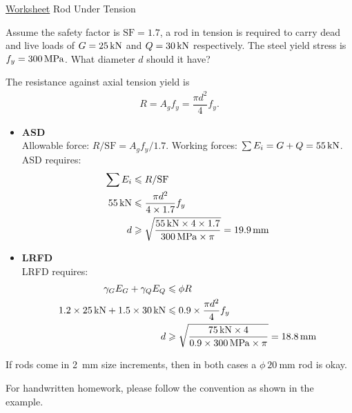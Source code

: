 \begin{exmp}\href{run:./WORKSHEET/CH01/EX1.UTRD.sm}{Worksheet}
Rod Under Tension

Assume the safety factor is $\mathrm{SF}=\num{1.7}$, a rod in tension is required to carry dead and live loads of $G=\SI{25}{\kilo\newton}$ and $Q=\SI{30}{\kilo\newton}$ respectively. The steel yield stress is $f_y=\SI{300}{\mega\pascal}$. What diameter $d$ should it have?
\begin{figure}[H]

\end{figure}
\end{exmp}
\begin{solution}
The resistance against axial tension yield is
\begin{gather*}
R=A_gf_y=\dfrac{\pi{}d^2}{4}f_y.
\end{gather*}
\begin{itemize}
\item \textbf{ASD}\\
Allowable force: $R/\mathrm{SF}=A_gf_y/\num{1.7}$. Working forces: $\sum{}E_i=G+Q=\SI{55}{\kilo\newton}$.\\
ASD requires:
\begin{align*}
\sum{}E_i&\leqslant{}R/\mathrm{SF}\\
\SI{55}{\kilo\newton}&\leqslant\dfrac{\pi{}d^2}{4\times1.7}f_y\\
d&\geqslant\sqrt{\dfrac{\SI{55}{\kilo\newton}\times4\times1.7}{\SI{300}{\mega\pascal}\times\pi}}=\SI{19.9}{\milli\meter}
\end{align*}
\item \textbf{LRFD}\\
LRFD requires:
\begin{align*}
\gamma_GE_G+\gamma_QE_Q&\leqslant\phi{}R\\
1.2\times\SI{25}{\kilo\newton}+1.5\times\SI{30}{\kilo\newton}&\leqslant0.9\times\dfrac{\pi{}d^2}{4}f_y\\
d&\geqslant\sqrt{\dfrac{\SI{75}{\kilo\newton}\times4}{0.9\times\SI{300}{\mega\pascal}\times\pi}}=\SI{18.8}{\milli\meter}
\end{align*}
\end{itemize}
If rods come in \SI{2}{\mm} size increments, then in both cases a $\phi~\SI{20}{\mm}$ rod is okay.
\end{solution}
\clearpage
For handwritten homework, please follow the convention as shown in the example.
